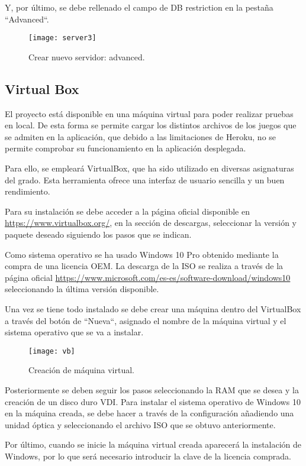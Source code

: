 Y, por último, se debe rellenado el campo de DB restriction en la pestaña ``Advanced``.
    \begin{figure}[htbp]
    \centering
    \texttt{[image: server3]}
    \caption{Crear nuevo servidor: advanced.}
    \label{fig:server3}
    \end{figure}

\subsection{Virtual Box}
El proyecto está disponible en una máquina virtual para poder realizar pruebas en local. De esta forma se permite cargar los distintos archivos de los juegos que se admiten en la aplicación, que debido a las limitaciones de Heroku, no se permite comprobar su funcionamiento en la aplicación desplegada.

Para ello, se empleará VirtualBox, que ha sido utilizado en diversas asignaturas del grado. Esta herramienta ofrece una interfaz de usuario sencilla y un buen rendimiento.

Para su instalación se debe acceder a la página oficial disponible en \url{https://www.virtualbox.org/}, en la sección de descargas,  seleccionar la versión y paquete deseado siguiendo los pasos que se indican.

Como sistema operativo se ha usado Windows 10 Pro obtenido mediante la compra de una licencia OEM. La descarga de la ISO se realiza a través de la página oficial \url{https://www.microsoft.com/es-es/software-download/windows10} seleccionando la última versión disponible.

Una vez se tiene todo instalado se debe crear una máquina dentro del VirtualBox a través del botón de ``Nueva``, asignado el nombre de la máquina virtual y el sistema operativo que se va a instalar.
    \begin{figure}[htbp]
    \centering
    \texttt{[image: vb]}
    \caption{Creación de máquina virtual.}
    \label{fig:vb}
    \end{figure}
    
Posteriormente se deben seguir los pasos seleccionando la RAM que se desea y la creación de un disco duro VDI. Para instalar el sistema operativo de Windows 10 en la máquina creada, se debe hacer a través de la configuración añadiendo una unidad óptica y seleccionando el archivo ISO que se obtuvo anteriormente.

Por último, cuando se inicie la máquina virtual creada aparecerá la instalación de Windows, por lo que será necesario introducir la clave de la licencia comprada.

